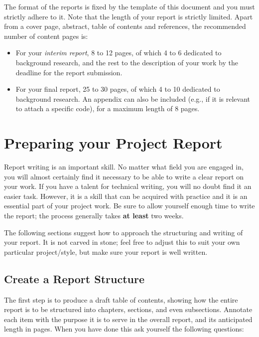 \documentclass[]{final_report}
\begin{document}
The format of the reports is fixed by the template of this document and you must  strictly adhere to it.  Note that the length of your report is strictly limited. Apart from a cover page, abstract, table of contents and references, the recommended number of content pages is:

\begin{itemize}
\item For your \emph{interim report}, 8 to 12 pages, of which 4 to 6 dedicated to background research, and the rest to the description of your work by the deadline for the report submission.

\item For your final report, 25 to 30 pages, of which 4 to 10 dedicated to background research. An appendix can also be included (e.g., if it is relevant to attach a specific code), for a maximum length of 8 pages.
\end{itemize}

\chapter{Preparing your Project Report}

Report writing is an important skill. No matter what field you are engaged in, you will almost certainly find it necessary to be able to write a clear report on your work. If you have a talent for technical writing, you will no doubt find it an easier task. However, it is a skill that can be acquired with practice and it is an essential part of your project work. Be sure to allow yourself enough time to write the report; the process generally takes {\bf at least} two weeks. 

The following sections suggest how to approach the structuring and writing of your report. It is not carved in stone; feel free to adjust this to suit your own particular project/style, but make sure your report is well written.

\section{Create a Report Structure}

The first step is to produce a draft table of contents, showing how the entire report is to be structured into chapters, sections, and even subsections. Annotate each item with the purpose it is to serve in the overall report, and its anticipated length in pages. When you have done this ask yourself the following questions:
\end{document}
